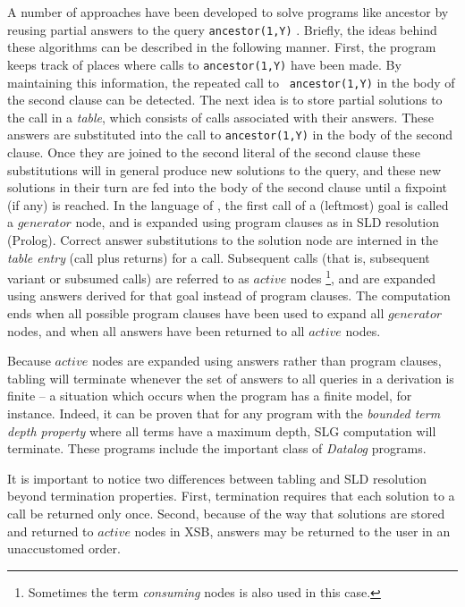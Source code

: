 A number of approaches have been developed to solve programs like
ancestor by reusing partial answers to the query {\tt ancestor(1,Y)}
\cite{Diet87,TaSa86,BMSU86,Viei89,Walk93}. Briefly, the ideas behind
these algorithms can be described in the following manner.  First, the
program keeps track of places where calls to {\tt ancestor(1,Y)} have
been made.  By maintaining this information, the repeated call to {\tt
ancestor(1,Y)} in the body of the second clause can be detected.  The
next idea is to store partial solutions to the call in a {\em table},
which consists of calls associated with their answers.  These answers
are substituted into the call to {\tt ancestor(1,Y)} in the body of
the second clause.  Once they are joined to the second literal of the
second clause these substitutions will in general produce new
solutions to the query, and these new solutions in their turn are fed
into the body of the second clause until a fixpoint (if any) is
reached.  In the language of
\cite{ChWa96}, the first call of a (leftmost) goal is called a
$generator$ node, and is expanded using program clauses as in SLD
resolution (Prolog).  Correct answer substitutions to the solution
node are interned in the {\em table entry} (call plus returns) for a
call.  Subsequent calls (that is, subsequent variant or subsumed
calls) are referred to as $active$ nodes
%
\footnote{Sometimes the term {\em consuming} nodes is also used in
this case.}, 
%
and are expanded using answers derived for that goal instead of
program clauses.  The computation ends when all possible program
clauses have been used to expand all $generator$ nodes, and when all
answers have been returned to all $active$ nodes.

Because $active$ nodes are expanded using answers rather than program
clauses, tabling will terminate whenever the set of answers to all
queries in a derivation is finite -- a situation which occurs when the
program has a finite model, for instance.  Indeed, it can be proven
that for any program with the {\em bounded term depth property} where
all terms have a maximum depth, SLG computation will terminate.  These
programs include the important class of {\em Datalog} programs.

It is important to notice two differences between tabling and SLD
resolution beyond termination properties.  First, termination requires
that each solution to a call be returned only once.  Second, because
of the way that solutions are stored and returned to $active$ nodes in
XSB, answers may be returned to the user in an unaccustomed order.


